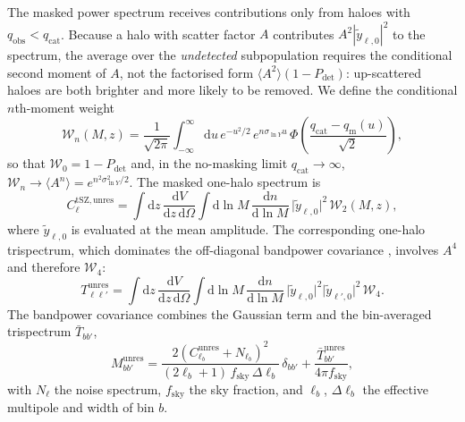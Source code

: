\documentclass[aps,prd,twocolumn,superscriptaddress,nofootinbib,floatfix]{revtex4-2}
\newcommand{\dd}{\mathrm{d}}
\begin{document}
The masked power spectrum receives contributions only from haloes with $q_{\mathrm{obs}} < q_{\mathrm{cat}}$.
Because a halo with scatter factor $A$ contributes $A^2 |\tilde y_{\ell,0}|^2$ to the spectrum, the average over the \emph{undetected} subpopulation requires the conditional second moment of $A$, not the factorised form $\langle A^2 \rangle (1 - P_{\mathrm{det}})$: up-scattered haloes are both brighter and more likely to be removed.
We define the conditional $n$th-moment weight
\begin{equation}
    \mathcal{W}_n(M,z)
    = \frac{1}{\sqrt{2\pi}}
    \int_{-\infty}^{\infty} \dd u\, e^{-u^2/2}\,
    e^{n \sigma_{\ln Y} u}\,
    \Phi\!\left(\frac{q_{\mathrm{cat}} - q_{\mathrm{m}}(u)}{\sqrt{2}}\right),
    \label{eq:Wn}
\end{equation}
so that $\mathcal{W}_0 = 1 - P_{\mathrm{det}}$ and, in the no-masking limit $q_{\mathrm{cat}} \to \infty$, $\mathcal{W}_n \to \langle A^n \rangle = e^{n^2 \sigma_{\ln Y}^2 / 2}$.
The masked one-halo spectrum is
\begin{equation}
    C_\ell^{\mathrm{tSZ,unres}}
    = \int \dd z \,\frac{\dd V}{\dd z \,\dd \Omega}
    \int \dd \ln M \,\frac{\dd n}{\dd \ln M}\,
    \bigl|\tilde y_{\ell,0}\bigr|^2\,
    \mathcal{W}_2(M,z),
    \label{eq:masked_ps}
\end{equation}
where $\tilde y_{\ell,0}$ is evaluated at the mean amplitude.
The corresponding one-halo trispectrum, which dominates the off-diagonal bandpower covariance \citep{Cooray:2002dia,Horowitz:2017dsh}, involves $A^4$ and therefore $\mathcal{W}_4$:
\begin{equation}
    T_{\ell\ell'}^{\mathrm{unres}}
    = \int \dd z \,\frac{\dd V}{\dd z \,\dd \Omega}
    \int \dd \ln M \,\frac{\dd n}{\dd \ln M}\,
    \bigl|\tilde y_{\ell,0}\bigr|^2
    \bigl|\tilde y_{\ell',0}\bigr|^2\,
    \mathcal{W}_4 .
    \label{eq:masked_trispec}
\end{equation}
The bandpower covariance combines the Gaussian term and the bin-averaged trispectrum $\bar T_{bb'}$,
\begin{equation}
    M_{bb'}^{\mathrm{unres}}
    = \frac{2\left(C_{\ell_b}^{\mathrm{unres}} + N_{\ell_b}\right)^2}
    {(2\ell_b + 1)\, f_{\mathrm{sky}}\, \Delta\ell_b}\, \delta_{bb'}
    + \frac{\bar T_{bb'}^{\mathrm{unres}}}{4\pi f_{\mathrm{sky}}},
    \label{eq:covariance}
\end{equation}
with $N_\ell$ the noise spectrum, $f_{\mathrm{sky}}$ the sky fraction, and $\ell_b$, $\Delta\ell_b$ the effective multipole and width of bin $b$.
\end{document}
